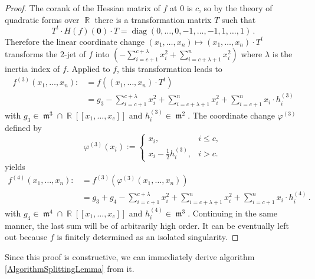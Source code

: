 \documentclass[noend]{amsproc}
\DeclareMathOperator{\m}{\mathfrak{m}}
\DeclareMathOperator{\diag}{diag}
\DeclareMathOperator{\R}{\mathbb{R}}
\begin{document}
\begin{proof}
The corank of the Hessian matrix of $f$ at $0$ is $c$, so by the theory of
quadratic forms over $\R$ there is a transformation matrix $T$ such that
\[
T^t \cdot H(f)(\mathbf{0}) \cdot T = \diag(0,\ldots,0,-1,\ldots,-1,1,\ldots,1)
\,.
\]
Therefore the linear coordinate change
$(x_1,\ldots,x_n) \mapsto (x_1,\ldots,x_n) \cdot T^t$ transforms the 2-jet of
$f$ into
$\left(-\sum_{i=c+1}^{c+\lambda} x_i^2 +\sum_{i=c+\lambda+1}^n x_i^2\right)$
where $\lambda$ is the inertia index of $f$.
Applied to $f$, this transformation leads to
\begin{align*}
f^{(3)} (x_1,\ldots,x_n)
  :\!&= f((x_1,\ldots,x_n) \cdot T^t) \\
  &= g_3
  -\sum_{i=c+1}^{c+\lambda} x_i^2 +\sum_{i=c+\lambda+1}^n x_i^2
  +\sum_{i=c+1}^n x_i\cdot h_i^{(3)}
\end{align*}
with $g_3 \in \m^3 \cap \R[[x_1,\ldots,x_c]]$ and $h_i^{(3)} \in \m^2$. The
coordinate change $\varphi^{(3)}$ defined by
\[
\varphi^{(3)}(x_i) :=
\begin{cases}
x_i, &i \leq c, \\
x_i-\frac{1}{2}h_i^{(3)}, &i > c.
\end{cases}
\]
yields
\begin{align*}
f^{(4)} (x_1,\ldots,x_n)
  :\!&= f^{(3)}(\varphi^{(3)}(x_1,\ldots,x_n)) \\
  &= g_3 +g_4
  -\sum_{i=c+1}^{c+\lambda} x_i^2 +\sum_{i=c+\lambda+1}^n x_i^2
  +\sum_{i=c+1}^n x_i\cdot h_i^{(4)} \,.
\end{align*}
with $g_4 \in \m^4 \cap \R[[x_1,\ldots,x_c]]$ and $h_i^{(4)} \in \m^3$.
Continuing in the same manner, the last sum will be of arbitrarily high order.
It can be eventually left out because $f$ is finitely determined as an isolated
singularity.
\end{proof}

Since this proof is constructive, we can immediately derive algorithm
\ref{AlgorithmSplittingLemma} from it.
\end{document}
